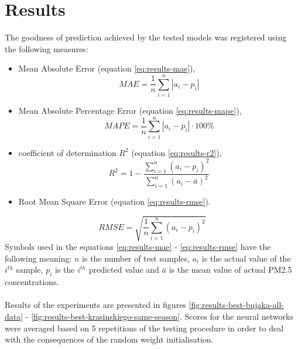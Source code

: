 \chapter{Results}\label{chap:results}

The goodness of prediction achieved by the tested models was registered using the following measures:
\begin{itemize}

    \item Mean Absolute Error (equation \ref{eq:results-mae}),
\begin{equation}\label{eq:results-mae}
MAE = \frac{1}{n} \sum_{i = 1}^{n} |a_i - p_i|
\end{equation}

    \item Mean Absolute Percentage Error (equation \ref{eq:results-mape}),
\begin{equation}\label{eq:results-mape}
MAPE = \frac{1}{n} \sum_{i = 1}^{n} |a_i - p_i| \cdot 100\%
\end{equation}

    \item coefficient of determination $R^2$ (equation \ref{eq:results-r2}),
\begin{equation}\label{eq:results-r2}
R^2 = 1 - \frac{
    \sum_{i = 1}^{n} (a_i - p_i)^2
}{
    \sum_{i = 1}^{n} (a_i - \bar{a})^2
}
\end{equation}

    \item Root Mean Square Error (equation \ref{eq:results-rmse}).
\end{itemize}
\begin{equation}\label{eq:results-rmse}
RMSE = \sqrt{
    \frac{1}{n} \sum_{i = 1}^{n} (a_i - p_i)^2
}
\end{equation}
Symbols used in the equations \ref{eq:results-mae} - \ref{eq:results-rmse} have the following meaning: $n$ is the number of test samples, $a_i$ is the actual value of the $i^{th}$ sample, $p_i$ is the $i^{th}$ predicted value and $\bar{a}$ is the mean value of actual PM2.5 concentrations.
\\\\
Results of the experiments are presented in figures \ref{fig:results-best-bujaka-all-data} - \ref{fig:results-best-krasinskiego-same-season}. Scores for the neural networks were averaged based on 5 repetitions of the testing procedure in order to deal with the consequences of the random weight initialisation.

